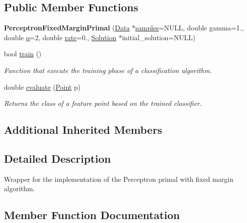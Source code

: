 \subsection*{Public Member Functions}
\begin{DoxyCompactItemize}
\item 
\mbox{\label{class_perceptron_fixed_margin_primal_a2128977635875acf812b693df741baf8}} 
{\bfseries Perceptron\+Fixed\+Margin\+Primal} (\hyperlink{class_data}{Data} $\ast$\hyperlink{class_classifier_a515c225d0da93df02ca79f9f87811d17}{samples}=N\+U\+LL, double gamma=1., double \hyperlink{class_primal_classifier_a746ad2ff93fb77d82ae389f90dbdc89e}{q}=2, double \hyperlink{class_classifier_af9867e5919742de1303dd971a9a1c19a}{rate}=0., \hyperlink{class_solution}{Solution} $\ast$initial\+\_\+solution=N\+U\+LL)
\item 
bool \hyperlink{class_perceptron_fixed_margin_primal_ad41c2a42c4a819c03bf9879110b0f99f}{train} ()
\begin{DoxyCompactList}\small\item\em Function that execute the training phase of a classification algorithm. \end{DoxyCompactList}\item 
double \hyperlink{class_perceptron_fixed_margin_primal_af72c3dde96f1f1b803c7b522b5c1cc0f}{evaluate} (\hyperlink{class_point}{Point} p)
\begin{DoxyCompactList}\small\item\em Returns the class of a feature point based on the trained classifier. \end{DoxyCompactList}\end{DoxyCompactItemize}
\subsection*{Additional Inherited Members}


\subsection{Detailed Description}
Wrapper for the implementation of the Perceptron primal with fixed margin algorithm. 

\subsection{Member Function Documentation}
\mbox{\label{class_perceptron_fixed_margin_primal_af72c3dde96f1f1b803c7b522b5c1cc0f}} 
